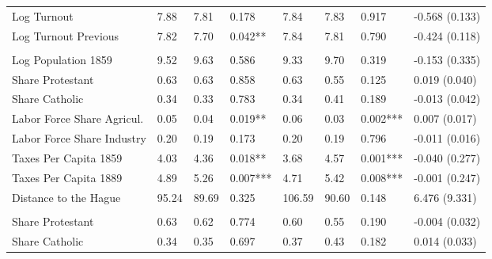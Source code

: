 \begin{table}[!h]
{\begin{threeparttable}
\begin{tabular}[t]{llllllll}
\hspace{1em}Log Turnout & \num{7.88} & \num{7.81} & 0.178 & \num{7.84} & \num{7.83} & 0.917 & -0.568 (0.133)\\
\hspace{1em}Log Turnout Previous & \num{7.82} & \num{7.70} & 0.042** & \num{7.84} & \num{7.81} & 0.790 & -0.424 (0.118)\\
\addlinespace[0.3em]
\multicolumn{8}{l}{\textbf{Panel D: Birthplace Characteristics}}\\
\hspace{1em}Log Population 1859 & \num{9.52} & \num{9.63} & 0.586 & \num{9.33} & \num{9.70} & 0.319 & -0.153 (0.335)\\
\hspace{1em}Share Protestant & \num{0.63} & \num{0.63} & 0.858 & \num{0.63} & \num{0.55} & 0.125 & 0.019 (0.040)\\
\hspace{1em}Share Catholic & \num{0.34} & \num{0.33} & 0.783 & \num{0.34} & \num{0.41} & 0.189 & -0.013 (0.042)\\
\hspace{1em}Labor Force Share Agricul. & \num{0.05} & \num{0.04} & 0.019** & \num{0.06} & \num{0.03} & 0.002*** & 0.007 (0.017)\\
\hspace{1em}Labor Force Share Industry & \num{0.20} & \num{0.19} & 0.173 & \num{0.20} & \num{0.19} & 0.796 & -0.011 (0.016)\\
\hspace{1em}Taxes Per Capita 1859 & \num{4.03} & \num{4.36} & 0.018** & \num{3.68} & \num{4.57} & 0.001*** & -0.040 (0.277)\\
\hspace{1em}Taxes Per Capita 1889 & \num{4.89} & \num{5.26} & 0.007*** & \num{4.71} & \num{5.42} & 0.008*** & -0.001 (0.247)\\
\hspace{1em}Distance to the Hague & \num{95.24} & \num{89.69} & 0.325 & \num{106.59} & \num{90.60} & 0.148 & 6.476 (9.331)\\
\addlinespace[0.3em]
\multicolumn{8}{l}{\textbf{Panel E: District Characteristics}}\\
\hspace{1em}Share Protestant & \num{0.63} & \num{0.62} & 0.774 & \num{0.60} & \num{0.55} & 0.190 & -0.004 (0.032)\\
\hspace{1em}Share Catholic & \num{0.34} & \num{0.35} & 0.697 & \num{0.37} & \num{0.43} & 0.182 & 0.014 (0.033)\\

\end{tabular}
\end{threeparttable}}
\end{table}
